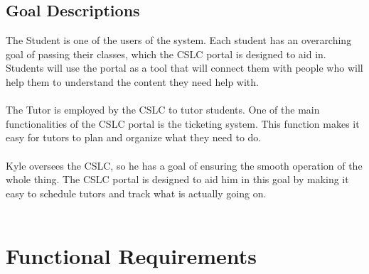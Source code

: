 \documentclass[oneside,openany,obeyspaces]{book}
\newcommand\tab[1][1cm]{\hspace*{#1}}
\begin{document}
\begin{flushleft}
    \subsection{Goal Descriptions}

    \tab The Student is one of the users of the system. Each student has an overarching goal of passing their classes, which the CSLC portal is designed to aid in. Students will use the portal as a tool that will connect them with people who will help them to understand the content they need help with.\\~\\

    \tab The Tutor is employed by the CSLC to tutor students. One of the main functionalities of the CSLC portal is the ticketing system. This function makes it easy for tutors to plan and organize what they need to do.\\~\\

    \tab Kyle oversees the CSLC, so he has a goal of ensuring the smooth operation of the whole thing. The CSLC portal is designed to aid him in this goal by making it easy to schedule tutors and track what is actually going on.\\~\\


    \section{Functional Requirements} \label{sec:Functional Requirements}


\end{flushleft}
\end{document}
